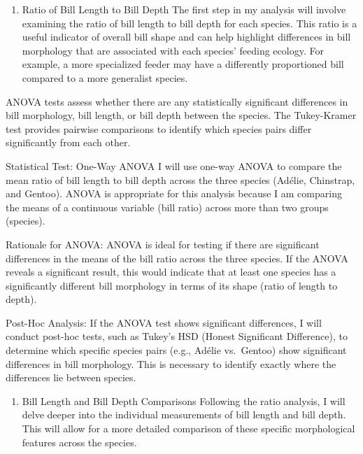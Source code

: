 \documentclass[
]{article}
\providecommand{\tightlist}{%
  \setlength{\itemsep}{0pt}\setlength{\parskip}{0pt}}
\begin{document}
\begin{enumerate}
\def\labelenumi{\arabic{enumi}.}
\tightlist
\item
  Ratio of Bill Length to Bill Depth The first step in my analysis will
  involve examining the ratio of bill length to bill depth for each
  species. This ratio is a useful indicator of overall bill shape and
  can help highlight differences in bill morphology that are associated
  with each species' feeding ecology. For example, a more specialized
  feeder may have a differently proportioned bill compared to a more
  generalist species.
\end{enumerate}

ANOVA tests assess whether there are any statistically significant
differences in bill morphology, bill length, or bill depth between the
species. The Tukey-Kramer test provides pairwise comparisons to identify
which species pairs differ significantly from each other.

Statistical Test: One-Way ANOVA I will use one-way ANOVA to compare the
mean ratio of bill length to bill depth across the three species
(Adélie, Chinstrap, and Gentoo). ANOVA is appropriate for this analysis
because I am comparing the means of a continuous variable (bill ratio)
across more than two groups (species).

Rationale for ANOVA: ANOVA is ideal for testing if there are significant
differences in the means of the bill ratio across the three species. If
the ANOVA reveals a significant result, this would indicate that at
least one species has a significantly different bill morphology in terms
of its shape (ratio of length to depth).

Post-Hoc Analysis: If the ANOVA test shows significant differences, I
will conduct post-hoc tests, such as Tukey's HSD (Honest Significant
Difference), to determine which specific species pairs (e.g., Adélie
vs.~Gentoo) show significant differences in bill morphology. This is
necessary to identify exactly where the differences lie between species.

\begin{enumerate}
\def\labelenumi{\arabic{enumi}.}
\setcounter{enumi}{1}
\tightlist
\item
  Bill Length and Bill Depth Comparisons Following the ratio analysis, I
  will delve deeper into the individual measurements of bill length and
  bill depth. This will allow for a more detailed comparison of these
  specific morphological features across the species.
\end{enumerate}
\end{document}
